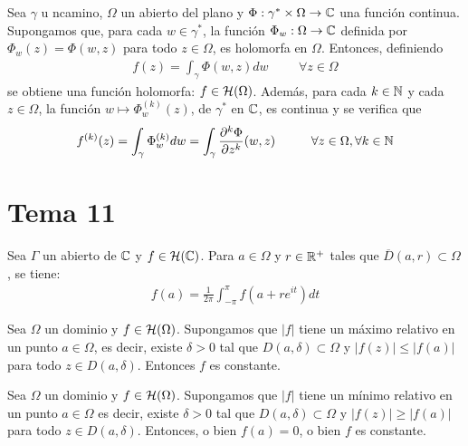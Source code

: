 \documentclass[12pt]{article}
\begin{document}
    \begin{teo}
        Sea $\gamma$ u ncamino, $\Omega$ un abierto del plano y $\Phi:\gamma^* \times \Omega \to \mathbb{C}$ una función continua. Supongamos que, para cada $w\in \gamma^*$, la función $\Phi_w:\Omega \to \mathbb{C}$ definida por $\Phi_w(z) = \Phi(w,z)$ para todo $z\in \Omega$, es holomorfa en $\Omega$. Entonces, definiendo
        \begin{gather*}
            f(z) = \int_\gamma \Phi(w,z) dw \hspace{1cm} \forall z \in \Omega
        \end{gather*}
        se obtiene una función holomorfa: $f \in \mathcal{H}(\Omega)$. Además, para cada $k\in \mathbb{N}$ y cada $z\in \Omega$, la función $w \mapsto \Phi_w ^{(k)}(z)$, de $\gamma^*$ en $\mathbb{C}$, es continua y se verifica que
        \begin{gather*}
            f^{(k)} (z) = \int_\gamma \Phi_w^{(k)} dw = \int_\gamma \frac{\partial^k \Phi}{\partial z^k}(w,z) \hspace{1cm} \forall z \in \Omega, \forall k \in \mathbb{N}
        \end{gather*}
    \end{teo}

    \section{Tema 11}

    \begin{prop}
        Sea $\Gamma$ un abierto de $\mathbb{C}$ y $f\in \mathcal{H}(\mathbb{C})$. Para $a\in \Omega$ y $r\in \mathbb{R}^+$ tales que $\overline{D}(a,r)\subset \Omega$, se tiene:
        \begin{gather*}
            f(a) = \frac{1}{2\pi} \int_{-\pi}^{\pi} f(a+re^{it}) dt
        \end{gather*}
    \end{prop}

    \begin{teo} Sea $\Omega$ un dominio y $f\in \mathcal{H}(\Omega)$. Supongamos que $|f|$ tiene un máximo relativo en un punto $a\in \Omega$, es decir, existe $\delta > 0$ tal que $D(a, \delta)\subset \Omega$ y $|f(z)| \leq |f(a)|$ para todo $z\in D(a, \delta)$. Entonces $f$ es constante.
    \end{teo}

    \begin{teo} Sea $\Omega$ un dominio y $f\in \mathcal{H}(\Omega)$. Supongamos que $|f|$ tiene un mínimo relativo en un punto $a\in \Omega$ es decir, existe $\delta > 0$ tal que $D(a, \delta)\subset \Omega$ y $|f(z)| \geq |f(a)|$ para todo $z\in D(a, \delta)$. Entonces, o bien $f(a)=0$, o bien $f$ es constante.
    \end{teo}
\end{document}
